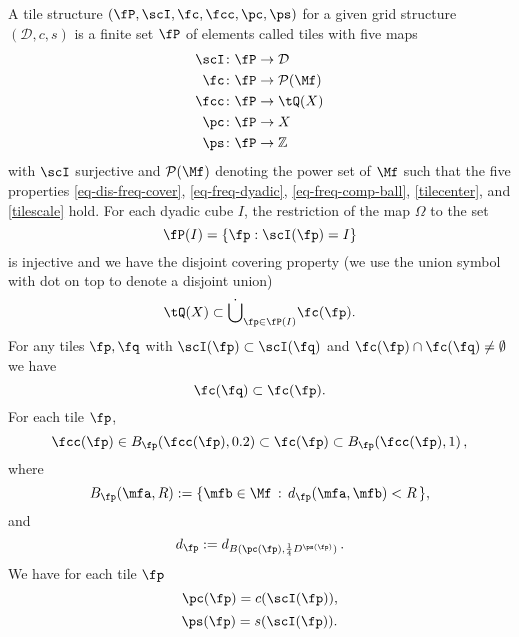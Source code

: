 A tile structure $(\fP,\scI,\fc,\fcc,\pc,\ps)$
for a given grid structure $(\mathcal{D}, c, s)$
is a finite set $\fP$ of elements called tiles with five maps
\begin{align*}
\scI&\colon \fP\to {\mathcal{D}}\\
\fc&\colon \fP\to \mathcal{P}(\Mf) \\
\fcc &\colon \fP\to \tQ(X)\\
\pc &\colon \fP\to X\\
\ps &\colon \fP\to \mathbb{Z}
\end{align*}
with $\scI$ surjective and $\mathcal{P}(\Mf)$ denoting the power set of $\Mf$ such that the five properties \eqref{eq-dis-freq-cover}, \eqref{eq-freq-dyadic},
\eqref{eq-freq-comp-ball}, \eqref{tilecenter}, and
\eqref{tilescale} hold.
For each dyadic cube $I$, the restriction of the map $\Omega$ to the set
\begin{equation}\label{injective}
    \fP(I)=\{\fp: \scI(\fp) =I\}
\end{equation}
is injective
and we have the disjoint covering property (we use the union symbol with dot on top to denote a disjoint union)
\begin{equation}\label{eq-dis-freq-cover}
\tQ(X)\subset \dot{\bigcup}_{\fp\in \fP(I)}\fc(\fp).
\end{equation}
For any tiles $\fp,\fq$ with $\scI(\fp)\subset \scI(\fq)$ and $\fc(\fp) \cap \fc(\fq) \neq \emptyset$ we have
\begin{equation} \label{eq-freq-dyadic}
\fc(\fq)\subset \fc(\fp) .
\end{equation}
For each tile $\fp$,
        \begin{equation}\label{eq-freq-comp-ball}
        \fcc(\fp)\in B_{\fp}(\fcc(\fp), 0.2) \subset \fc(\fp) \subset B_{\fp}(\fcc(\fp),1)\,,
        \end{equation}
        where
\begin{equation}
    B_{\fp} (\mfa, R) := \{\mfb \in \Mf \, : \, d_{\fp}(\mfa, \mfb) < R\,\} ,
\end{equation}
 and
\begin{equation}\label{defdp}
d_{\fp} := d_{B(\pc(\fp),\frac 14 D^{\ps(\fp)})}\, .
\end{equation}
We have for each tile $\fp$
\begin{equation}\label{tilecenter}
    \pc(\fp)=c(\scI(\fp)),
\end{equation}
\begin{equation}\label{tilescale}
    \ps(\fp)=s(\scI(\fp)).
\end{equation}


